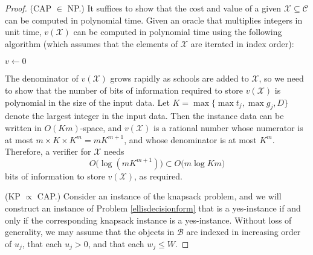 \documentclass[11pt]{article} %
\theoremstyle{definition}
\begin{document}
\begin{proof}
(CAP $\in$ NP.) It suffices to show that the cost and value of a given $\mathcal{X} \subseteq \mathcal{C}$ can be computed in polynomial time. Given an oracle that multiplies integers in unit time, $v(\mathcal{X})$ can be computed in polynomial time using the following algorithm (which assumes that the elements of $\mathcal{X}$ are iterated in index order):

\LinesNotNumbered 
\begin{algorithm}[h]
\SetAlgoCaptionSeparator{}%
\SetAlCapNameSty{}%
$v \gets 0$\;
\;
\end{algorithm}

\noindent The denominator of $v(\mathcal{X})$ grows rapidly as schools are added to $\mathcal{X}$, so we need to show that the number of bits of information required to store $v(\mathcal{X})$ is polynomial in the size of the input data. Let $K = \max\bigl\{\max t_j, \max g_j, D\bigr\}$ denote the largest integer in the input data. Then the instance data can be written in $O(K m)$-space, and $v(\mathcal{X})$ is a rational number whose numerator is at most $m \times K \times K^m = m K^{m+1}$, and whose denominator is at most $K^m$. Therefore, a verifier for $\mathcal{X}$ needs
\[O\bigl(\log (m K^{m+1}) \bigr) \subset O\bigl( m \log Km )\]
bits of information to store $v(\mathcal{X})$, as required.

(KP $\propto$ CAP.) Consider an instance of the knapsack problem, and we will construct an instance of Problem \ref{ellisdecisionform} that is a yes-instance if and only if the corresponding knapsack instance is a yes-instance. Without loss of generality, we may assume that the objects in $\mathcal{B}$ are indexed in increasing order of $u_j$, that each $u_j >0$, and that each $w_j \leq W$. 


\end{proof}
\end{document}
